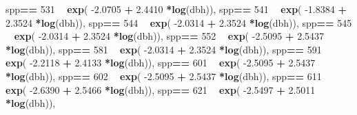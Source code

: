 \documentclass[
]{article}
\newenvironment{Shaded}{\begin{snugshade}}{\end{snugshade}}
\newcommand{\DecValTok}[1]{\textcolor[rgb]{0.00,0.00,0.81}{#1}}
\newcommand{\FloatTok}[1]{\textcolor[rgb]{0.00,0.00,0.81}{#1}}
\newcommand{\KeywordTok}[1]{\textcolor[rgb]{0.13,0.29,0.53}{\textbf{#1}}}
\newcommand{\NormalTok}[1]{#1}
\newcommand{\OperatorTok}[1]{\textcolor[rgb]{0.81,0.36,0.00}{\textbf{#1}}}
\newcommand{\StringTok}[1]{\textcolor[rgb]{0.31,0.60,0.02}{#1}}
\begin{document}
\begin{Shaded}
\begin{Highlighting}[]
\NormalTok{    spp}\OperatorTok{==}\StringTok{ }\DecValTok{531} \OperatorTok{~}\StringTok{ }\KeywordTok{exp}\NormalTok{( }\FloatTok{-2.0705}   \OperatorTok{+}\StringTok{    }\FloatTok{2.4410} \OperatorTok{*}\KeywordTok{log}\NormalTok{(dbh)),}
\NormalTok{    spp}\OperatorTok{==}\StringTok{ }\DecValTok{541} \OperatorTok{~}\StringTok{ }\KeywordTok{exp}\NormalTok{( }\FloatTok{-1.8384}   \OperatorTok{+}\StringTok{    }\FloatTok{2.3524} \OperatorTok{*}\KeywordTok{log}\NormalTok{(dbh)),}
\NormalTok{    spp}\OperatorTok{==}\StringTok{ }\DecValTok{544} \OperatorTok{~}\StringTok{ }\KeywordTok{exp}\NormalTok{( }\FloatTok{-2.0314}   \OperatorTok{+}\StringTok{    }\FloatTok{2.3524} \OperatorTok{*}\KeywordTok{log}\NormalTok{(dbh)),}
\NormalTok{    spp}\OperatorTok{==}\StringTok{ }\DecValTok{545} \OperatorTok{~}\StringTok{ }\KeywordTok{exp}\NormalTok{( }\FloatTok{-2.0314}   \OperatorTok{+}\StringTok{    }\FloatTok{2.3524} \OperatorTok{*}\KeywordTok{log}\NormalTok{(dbh)),}
\NormalTok{    spp}\OperatorTok{==}\StringTok{ }\DecValTok{552} \OperatorTok{~}\StringTok{ }\KeywordTok{exp}\NormalTok{( }\FloatTok{-2.5095}   \OperatorTok{+}\StringTok{    }\FloatTok{2.5437} \OperatorTok{*}\KeywordTok{log}\NormalTok{(dbh)),}
\NormalTok{    spp}\OperatorTok{==}\StringTok{ }\DecValTok{581} \OperatorTok{~}\StringTok{ }\KeywordTok{exp}\NormalTok{( }\FloatTok{-2.0314}   \OperatorTok{+}\StringTok{    }\FloatTok{2.3524} \OperatorTok{*}\KeywordTok{log}\NormalTok{(dbh)),}
\NormalTok{    spp}\OperatorTok{==}\StringTok{ }\DecValTok{591} \OperatorTok{~}\StringTok{ }\KeywordTok{exp}\NormalTok{( }\FloatTok{-2.2118}   \OperatorTok{+}\StringTok{    }\FloatTok{2.4133} \OperatorTok{*}\KeywordTok{log}\NormalTok{(dbh)),}
\NormalTok{    spp}\OperatorTok{==}\StringTok{ }\DecValTok{601} \OperatorTok{~}\StringTok{ }\KeywordTok{exp}\NormalTok{( }\FloatTok{-2.5095}   \OperatorTok{+}\StringTok{    }\FloatTok{2.5437} \OperatorTok{*}\KeywordTok{log}\NormalTok{(dbh)),}
\NormalTok{    spp}\OperatorTok{==}\StringTok{ }\DecValTok{602} \OperatorTok{~}\StringTok{ }\KeywordTok{exp}\NormalTok{( }\FloatTok{-2.5095}   \OperatorTok{+}\StringTok{    }\FloatTok{2.5437} \OperatorTok{*}\KeywordTok{log}\NormalTok{(dbh)),}
\NormalTok{    spp}\OperatorTok{==}\StringTok{ }\DecValTok{611} \OperatorTok{~}\StringTok{ }\KeywordTok{exp}\NormalTok{( }\FloatTok{-2.6390}   \OperatorTok{+}\StringTok{    }\FloatTok{2.5466} \OperatorTok{*}\KeywordTok{log}\NormalTok{(dbh)),}
\NormalTok{    spp}\OperatorTok{==}\StringTok{ }\DecValTok{621} \OperatorTok{~}\StringTok{ }\KeywordTok{exp}\NormalTok{( }\FloatTok{-2.5497}   \OperatorTok{+}\StringTok{    }\FloatTok{2.5011} \OperatorTok{*}\KeywordTok{log}\NormalTok{(dbh)),}

\end{Highlighting}
\end{Shaded}
\end{document}
